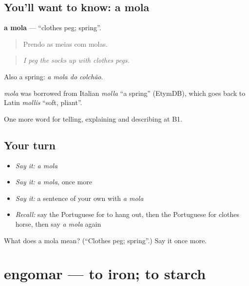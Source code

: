\subsection*{You'll want to know: a mola}
\textbf{a mola} — \textquotedblleft{}clothes peg; spring\textquotedblright{}.

\begin{quote}
Prendo as meias com molas.
\end{quote}

\begin{quote}
\emph{I peg the socks up with clothes pegs.}
\end{quote}

Also a spring: \emph{a mola do colchão}.

\begin{cousinweb}
\emph{mola} was borrowed from Italian \emph{molla} \textquotedblleft{}a spring\textquotedblright{} (EtymDB), which goes back to Latin \emph{mollis} \textquotedblleft{}soft, pliant\textquotedblright{}.
\end{cousinweb}

\begin{grammarlens}[title={What you've built}]
One more word for telling, explaining and describing at B1.
\end{grammarlens}

\subsection*{Your turn}
\begin{itemize}
\raggedright
  \item \emph{Say it:} \emph{a mola}
  \item \emph{Say it:} \emph{a mola}, once more
  \item \emph{Say it:} a sentence of your own with \emph{a mola}
  \item \emph{Recall:} say the Portuguese for to hang out, then the Portuguese for clothes horse, then say \emph{a mola} again
\end{itemize}

\begin{tcolorbox}[breakable,colback=teal!4,colframe=teal!35!black,title={Before you move on}]
What does a mola mean? (\textquotedblleft{}Clothes peg; spring\textquotedblright{}.) Say it once more.
\end{tcolorbox}
\section[engomar]{engomar — to iron; to starch}

